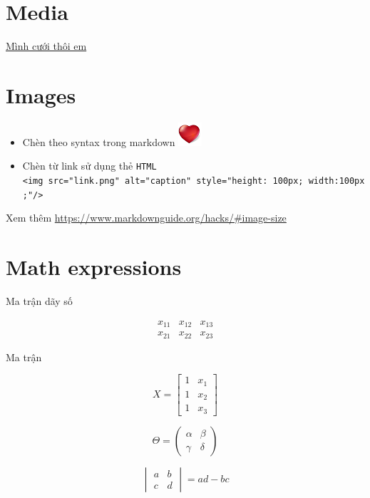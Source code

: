 \documentclass[
]{book}
\theoremstyle{definition}
\theoremstyle{definition}
\theoremstyle{definition}
\theoremstyle{definition}
\theoremstyle{remark}
\begin{document}
\hypertarget{media}{%
\section{Media}\label{media}}

\href{https://t.me/inspiring_melody/321}{Mình cưới thôi em}

\hypertarget{images}{%
\section{Images}\label{images}}

\begin{itemize}
\item
  Chèn theo syntax trong markdown
  \includegraphics{images/heart.png}
\item
  Chèn từ link sử dụng thẻ \texttt{HTML}
  \texttt{\textless{}img\ src="link.png"\ alt="caption"\ style="height:\ 100px;\ width:100px;"/\textgreater{}}
\end{itemize}

Xem thêm \url{https://www.markdownguide.org/hacks/\#image-size}

\hypertarget{math-expressions}{%
\section{Math expressions}\label{math-expressions}}

Ma trận dãy số

\[\begin{array}{ccc}
x_{11} & x_{12} & x_{13}\\
x_{21} & x_{22} & x_{23}
\end{array}\]

Ma trận

\[X = \begin{bmatrix}1 & x_{1}\\
1 & x_{2}\\
1 & x_{3}
\end{bmatrix}\]

\[\Theta = \begin{pmatrix}\alpha & \beta\\
\gamma & \delta
\end{pmatrix}\]

\[\begin{vmatrix}a & b\\
c & d
\end{vmatrix}=ad-bc\]
\end{document}
